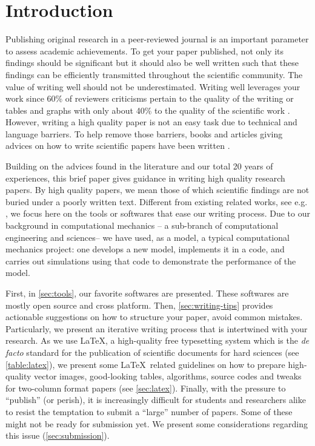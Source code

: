 \documentclass[authoryear,3p,times,preprint,review,fleqn]{elsarticle}
\numberwithin{equation}{section}
\theoremstyle{remark}
\begin{document}

\section{Introduction}

\showthe\textwidth %


Publishing original research in a peer-reviewed  journal is an important parameter to assess academic achievements. To get your paper published, not only its findings should be significant but it should also be well written such that these findings can be efficiently transmitted throughout the scientific community. The value of writing well should not be underestimated. Writing well leverages your work since 60\% of reviewers criticisms pertain to the quality of the writing or tables and graphs with only about 40\% to the quality of the scientific work \citep{iles1997guidebook}.
However, writing a high quality paper is not an easy task due to technical and language barriers. To help remove those barriers, books and articles giving advices on how to write scientific papers have been written \citep{day1998write,ashby2000write,plaxco2010art}. 


Building on the advices found in the literature and our total 20 years of experiences, this brief paper gives guidance in writing high quality research papers. By high quality papers, we mean those of which scientific findings are not buried under a poorly written text.
Different from existing related works, see e.g. \cite{day1998write,ashby2000write}, we focus here on the tools or softwares that ease our writing process. Due to our background in computational mechanics -- a sub-branch of computational engineering and sciences-- we have used, as a model, a typical computational mechanics project: one develops a new model, implements it in a code, and carries out simulations using that code to demonstrate the performance of the model. 

First, in \cref{sec:tools}, our favorite softwares are presented. These softwares are mostly open source and cross platform. Then, \cref{sec:writing-tips} provides actionable suggestions on how to structure your paper, avoid common mistakes.  Particularly, we present an iterative writing process that is intertwined with your research.
As we use \LaTeX, a high-quality free typesetting system which is the \textit{de facto} standard for the publication of scientific documents for hard sciences (see \cref{table:latex}), we present some \LaTeX\ related guidelines on how to prepare high-quality vector images, good-looking tables, algorithms, source codes and tweaks for two-column format papers (see \cref{sec:latex}). 
Finally, with the pressure to “publish” (or perish), it is increasingly difficult for students and researchers alike to resist the temptation to submit a “large” number of papers. Some of these might not be ready for submission yet. We present some considerations regarding this issue (\cref{sec:submission}).
\end{document}
